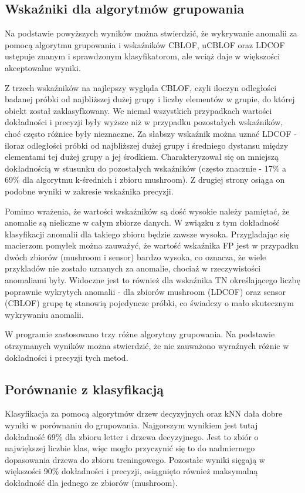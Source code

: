 \documentclass[11pt,a4paper,twoside]{article}
\begin{document}
\subsection {Wskaźniki dla algorytmów grupowania}

Na podstawie powyższych wyników można stwierdzić, że wykrywanie anomalii za pomocą algorytmu grupowania i wskaźników CBLOF, uCBLOF oraz LDCOF ustępuje znanym i sprawdzonym klasyfikatorom, ale wciąż daje w większości akceptowalne wyniki. 

Z trzech wskaźników na najlepszy wygląda CBLOF, czyli iloczyn odległości badanej próbki od najbliższej dużej grupy i liczby elementów w grupie, do której obiekt został zaklasyfkowany. We niemal wszystkich przypadkach wartości dokładności i precyzji były wyższe niż w przypadku pozostałych wskaźników, choć często różnice były nieznaczne. Za słabszy wskaźnik można uznać LDCOF - iloraz odległości próbki od najbliższej dużej grupy i średniego dystansu między elementami tej dużej grupy a jej środkiem. Charakteryzował się on mniejszą dokładnością w stusunku do pozostałych wskaźników (często znacznie - 17\% a 69\% dla algorytmu k-średnich i zbioru mushroom). Z drugiej strony osiąga on podobne wyniki w zakresie wskaźnika precyzji.

Pomimo wrażenia, że wartości wskaźników są dość wysokie należy pamiętać, że anomalie są nieliczne w całym zbiorze danych. W związku z tym dokładność klasyfikacji anomalii dla takiego zbioru będzie zawsze wysoka. Przygladając się macierzom pomyłek można zauważyć, że wartość wskaźnika FP jest w przypadku dwóch zbiorów (mushroom i sensor) bardzo wysoka, co oznacza, że wiele przykladów nie zostało uznanych za anomalie, chociaż w rzeczywistości anomaliami były. Widoczne jest to również dla wskaźnika TN określającego liczbę poprawnie wykrytych anomalii - dla zbiorów mushroom (LDCOF) oraz sensor (CBLOF) grupę tę stanowią pojedyncze próbki, co świadczy o mało skutecznym wykrywaniu anomalii.

W programie zastosowano trzy różne algorytmy grupowania. Na podstawie otrzymanych wyników można stwierdzić, że nie zauważono wyraźnych różnic w dokładności i precyzji tych metod. 

\subsection {Porównanie z klasyfikacją}

Klasyfikacja za pomocą algorytmów drzew decyzyjnych oraz kNN dała dobre wyniki w porównaniu do grupowania. Najgorszym wynikiem jest tutaj dokładność 69\% dla zbioru letter i drzewa decyzyjnego. Jest to zbiór o największej liczbie klas, więc mogło przyczynić się to do nadmiernego dopasowania drzewa do zbioru treningowego. Pozostałe wyniki sięgają w większości 90\% dokładności i precyzji, osiągnięto również maksymalną dokładność dla jednego ze zbiorów (mushroom).
\end{document}

